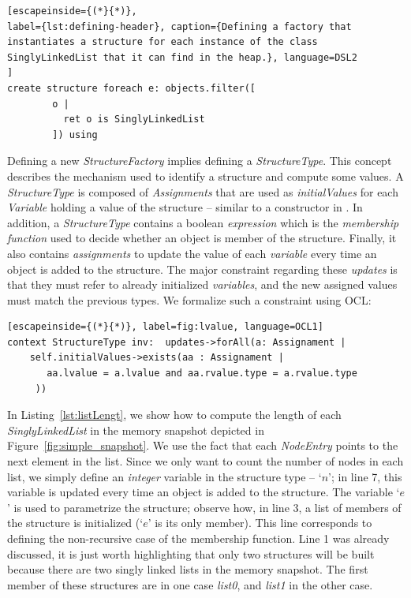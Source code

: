 \begin{lstlisting}[escapeinside={(*}{*)}, 
label={lst:defining-header}, caption={Defining a factory that instantiates a structure for each instance of the class SinglyLinkedList that it can find in the heap.}, language=DSL2
]
create structure foreach e: objects.filter([
		o | 
		  ret o is SinglyLinkedList
		]) using
\end{lstlisting}

Defining a new \textit{StructureFactory} implies defining a \textit{StructureType}.
This concept describes the mechanism used to identify a structure and compute some values.
A \textit{StructureType} is composed of \textit{Assignments} that are used as \textit{initialValues} for each \textit{Variable} holding a value of the structure -- similar to a constructor in .
In addition, a \textit{StructureType} contains a boolean \textit{expression} which is the \textit{membership function} used to decide whether an object is member of the structure.
Finally, it also contains \textit{assignments} to update the value of each \textit{variable} every time an object is added to the structure.
The major constraint regarding these \textit{updates} is that they must refer to already initialized \textit{variables}, and the new assigned values must match the previous types.
We formalize such a constraint using OCL:

\begin{lstlisting}[escapeinside={(*}{*)}, label=fig:lvalue, language=OCL1]
context StructureType inv:  updates->forAll(a: Assignament | 
    self.initialValues->exists(aa : Assignament | 
       aa.lvalue = a.lvalue and aa.rvalue.type = a.rvalue.type
     ))
\end{lstlisting}


In Listing~\ref{lst:listLengt}, we show how to compute the length of each \textit{SinglyLinkedList} in the memory snapshot depicted in Figure~\ref{fig:simple_snapshot}.
We use the fact that each \textit{NodeEntry} points to the next element in the list.
Since we only want to count the number of nodes in each list, we simply define an \textit{integer} variable in the structure type -- `$n$'; in line 7, this variable is updated every time an object is added to the structure.
The variable `$e$' is used to parametrize the structure; observe how, in line 3, a list of members of the structure is initialized (`$e$' is its only member).
This line corresponds to defining the non-recursive case of the membership function.
Line 1 was already discussed, it is just worth highlighting that only two structures will be built because there are two singly linked lists in the memory snapshot.
The first member of these structures are in one case \textit{list0}, and \textit{list1} in the other case.
 

